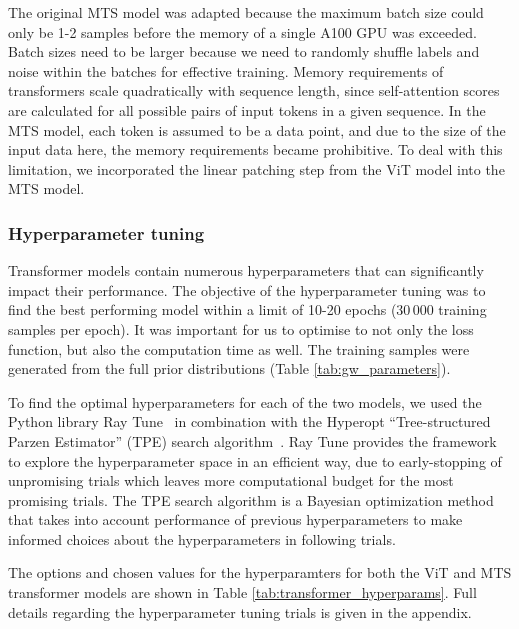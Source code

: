 The original MTS model was adapted because the maximum batch size could only be 1-2 samples before the memory of a single A100 GPU was exceeded. Batch sizes need to be larger because we need to randomly shuffle labels and noise within the batches for effective training. Memory requirements of transformers scale quadratically with sequence length, since self-attention scores are calculated for all possible pairs of input tokens in a given sequence. In the MTS model, each token is assumed to be a data point, and due to the size of the input data here, the memory requirements became prohibitive. To deal with this limitation, we incorporated the linear patching step from the ViT model into the MTS model.

\subsubsection{Hyperparameter tuning}

Transformer models contain numerous hyperparameters that can significantly impact their performance. The objective of the hyperparameter tuning was to find the best performing model within a limit of 10-20 epochs (30\,000 training samples per epoch). It was important for us to optimise to not only the loss function, but also the computation time as well. The training samples were generated from the full prior distributions (Table \ref{tab:gw_parameters}). 

To find the optimal hyperparameters for each of the two models, we used the Python library Ray Tune~\cite{liaw2018tune} in combination with the Hyperopt \enquote{Tree-structured Parzen Estimator} (TPE) search algorithm~\cite{Bergstra_Bardenet_Bengio_Kégl_2011}. Ray Tune provides the framework to explore the hyperparameter space in an efficient way, due to early-stopping of unpromising trials which leaves more computational budget for the most promising trials. The TPE search algorithm is a Bayesian optimization method that takes into account performance of previous hyperparameters to make informed choices about the hyperparameters in following trials.

The options and chosen values for the hyperparamters for both the ViT and MTS transformer models are shown in Table \ref{tab:transformer_hyperparams}. Full details regarding the hyperparameter tuning trials is given in the appendix.

